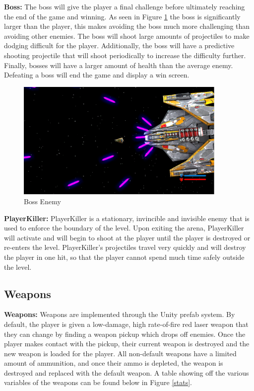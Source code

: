 \documentclass[12pt]{article}       %
\begin{document}
	{\bf Boss:} The boss will give the player a final challenge before ultimately reaching the end of the game and winning. As seen in Figure \ref{BossImage} the boss is significantly larger than the player, this makes avoiding the boss much more challenging than avoiding other enemies. The boss will shoot large amounts of projectiles to make dodging difficult for the player. Additionally, the boss will have a predictive shooting projectile that will shoot periodically to increase the difficulty further. Finally, bosses will have a larger amount of health than the average enemy. Defeating a boss will end the game and display a win screen. \\

\begin{figure} [H]\centering  \includegraphics[width=4in]{BossShooting.png} \caption{Boss Enemy} \label{BossImage} \end{figure} 

	{\bf PlayerKiller:} PlayerKiller is a stationary, invincible and invisible enemy that is used to enforce the boundary of the level. Upon exiting the arena, PlayerKiller will activate and will begin to shoot at the player until the player is destroyed or re-enters the level. PlayerKiller's projectiles travel very quickly and will destroy the player in one hit, so that the player cannot spend much time safely outside the level.


\subsection{Weapons} %

	{\bf Weapons:} Weapons are implemented through the Unity prefab system. By default, the player is given a low-damage, high rate-of-fire red laser weapon that they can change by finding a weapon pickup which drops off enemies. Once the player makes contact with the pickup, their current weapon is destroyed and the new weapon is loaded for the player. All non-default weapons have a limited amount of ammunition, and once their ammo is depleted, the weapon is destroyed and replaced with the default weapon. A table showing off the various variables of the weapons can be found below in Figure \ref{stats}.
\end{document}
